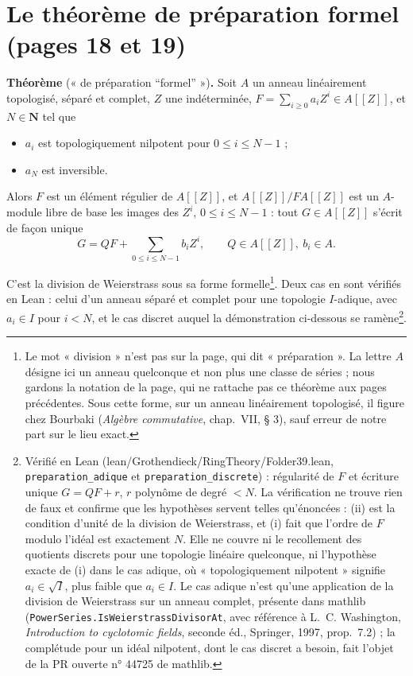 \documentclass[11pt,a4paper]{article}
\begin{document}
\section*{Le théorème de préparation formel (pages 18 et 19)}

\textbf{Théorème} (« de préparation “formel” »)\textbf{.} Soit $A$ un anneau
linéairement topologisé, séparé et complet, $Z$ une indéterminée,
$F = \sum_{i \geq 0} a_i Z^i \in A[[Z]]$, et $N \in \mathbf{N}$ tel que

\begin{itemize}
  \item[(i)] $a_i$ est topologiquement nilpotent pour $0 \leq i \leq N-1$ ;
  \item[(ii)] $a_N$ est inversible.
\end{itemize}

Alors $F$ est un élément régulier de $A[[Z]]$, et $A[[Z]]/F A[[Z]]$ est un
$A$-module libre de base les images des $Z^i$, $0 \leq i \leq N-1$ : tout
$G \in A[[Z]]$ s'écrit de façon unique
\[
  G = QF + \sum_{0 \leq i \leq N-1} b_i Z^i, \qquad Q \in A[[Z]],\ b_i \in A.
\]

C'est la division de Weierstrass sous sa forme formelle\footnote{Le mot
« division » n'est pas sur la page, qui dit « préparation ». La lettre $A$
désigne ici un anneau quelconque et non plus une classe de séries ; nous
gardons la notation de la page, qui ne rattache pas ce théorème aux pages
précédentes. Sous cette forme, sur un anneau linéairement topologisé, il
figure chez Bourbaki (\emph{Algèbre commutative}, chap.~VII, § 3), sauf erreur
de notre part sur le lieu exact.}. Deux cas en sont vérifiés en Lean : celui
d'un anneau séparé et complet pour une topologie $I$-adique, avec $a_i \in I$
pour $i < N$, et le cas discret auquel la démonstration ci-dessous se
ramène\footnote{Vérifié en Lean (lean/Grothendieck/RingTheory/Folder39.lean,
\texttt{preparation\_adique} et \texttt{preparation\_discrete}) : régularité de
$F$ et écriture unique $G = QF + r$, $r$ polynôme de degré $< N$. La vérification
ne trouve rien de faux et confirme que les hypothèses servent telles
qu'énoncées : (ii) est la condition d'unité de la division de Weierstrass, et
(i) fait que l'ordre de $F$ modulo l'idéal est exactement $N$. Elle ne couvre ni
le recollement des quotients discrets pour une topologie linéaire quelconque, ni
l'hypothèse exacte de (i) dans le cas adique, où « topologiquement nilpotent »
signifie $a_i \in \sqrt{I}$, plus faible que $a_i \in I$. Le cas adique n'est
qu'une application de la division de Weierstrass sur un anneau complet,
présente dans mathlib (\texttt{PowerSeries.IsWeierstrassDivisorAt}, avec
référence à L.~C. Washington, \emph{Introduction to cyclotomic fields}, seconde éd.,
Springer, 1997, prop.~7.2) ; la complétude pour un idéal nilpotent, dont le cas
discret a besoin, fait l'objet de la PR ouverte n° 44725 de mathlib.}.
\end{document}
